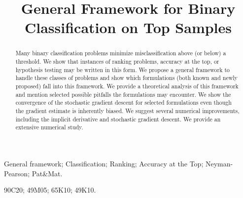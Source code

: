 \documentclass[]{interact}
\theoremstyle{plain}%
\theoremstyle{definition}
\theoremstyle{remark}
\begin{document}
\articletype{}%

\title{General Framework for Binary Classification on Top Samples}

\author{
}

\maketitle

\begin{abstract}
Many binary classification problems minimize misclassification above (or below) a threshold. We show that instances of ranking problems, accuracy at the top, or hypothesis testing may be written in this form. We propose a general framework to handle these classes of problems and show which formulations (both known and newly proposed) fall into this framework. We provide a theoretical analysis of this framework and mention selected possible pitfalls the formulations may encounter. We show the convergence of the stochastic gradient descent for selected formulations even though the gradient estimate is inherently biased. We suggest several numerical improvements, including the implicit derivative and stochastic gradient descent. We provide an extensive numerical study. %
\end{abstract}

\begin{keywords}
General framework; Classification; Ranking; Accuracy at the Top; Neyman-Pearson; Pat\&Mat.
\end{keywords}

\begin{amscode}
90C20; 49M05; 65K10; 49K10.
\end{amscode}
\end{document}
